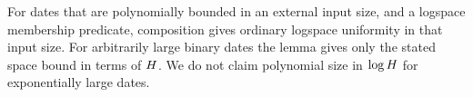 \begin{remark}\label{rem:largedates}
For dates that are polynomially bounded in an external input size, and a logspace membership
predicate, composition gives ordinary logspace uniformity in that input size. For arbitrarily large
binary dates the lemma gives only the stated space bound in terms of $H$. We do not claim
polynomial size in $\log H$ for exponentially large dates.
\end{remark}
